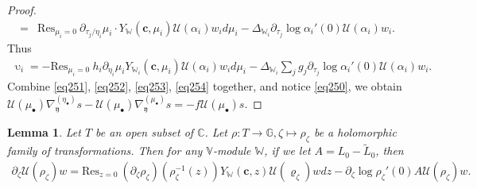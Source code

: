 \documentclass[12pt,b5paper,notitlepage]{report}
\theoremstyle{definition}
\theoremstyle{plain}
\newtheorem{lm}[df]{Lemma}
\newcommand{\mc}{\mathcal}
\newcommand{\wtd}{\widetilde}
\newcommand{\Res}{\mathrm{Res}}
\newcommand{\yk}{\mathfrak y}
\newcommand{\blt}{\bullet}
\newcommand{\Vbb}{\mathbb V}
\newcommand{\Wbb}{\mathbb W}
\newcommand{\Gbb}{\mathbb G}
\newcommand{\Cbb}{\mathbb C}
\newcommand{\cbf}{\mathbf c}
\numberwithin{equation}{section}
\begin{document}
\begin{proof}
\begin{align*}
=&\Res_{\mu_i=0}~\partial_{\tau_j/\eta_i}\mu_i\cdot Y_\Wbb(\cbf,\mu_i) \mc U(\alpha_i)w_i d\mu_i-\Delta_{\Wbb_i}\partial_{\tau_j}\log\alpha_i'(0)\mc U(\alpha_i)w_i.
\end{align*}
Thus
\begin{align}
\upupsilon_i=-\Res_{\mu_i=0}~h_i\partial_{\eta_i}\mu_i Y_{\Wbb_i}(\cbf,\mu_i)\mc U(\alpha_i)w_id\mu_i-\Delta_{\Wbb_i}\sum_j g_j\partial_{\tau_j}\log\alpha_i'(0)\mc U(\alpha_i)w_i.\label{eq254}
\end{align}
Combine \eqref{eq251}, \eqref{eq252}, \eqref{eq253}, \eqref{eq254} together, and notice \eqref{eq250}, we obtain $\mc U(\mu_\blt)\nabla_\yk^{(\eta_\blt)}s-\mc U(\mu_\blt)\nabla_\yk^{(\mu_\blt)}s=-f\mc U(\mu_\blt)s$.
\end{proof}




\begin{lm}\label{lb141}
Let $T$ be an open subset of $\Cbb$. Let $\rho:T\rightarrow\Gbb,\zeta\mapsto\rho_\zeta$ be a holomorphic family of transformations. Then for any $\Vbb$-module $\Wbb$, if we let $A=L_0-\wtd L_0$, then
\begin{align}
\partial_\zeta\mc U(\rho_\zeta)w=\Res_{z=0}~(\partial_\zeta\rho_\zeta)(\rho_\zeta^{-1}(z)) Y_\Wbb(\cbf,z) \mc U(\varrho_\zeta)w dz-\partial_\zeta\log\rho_\zeta'(0)A\mc U(\rho_\zeta)w.
\end{align}
\end{lm}
\end{document}
